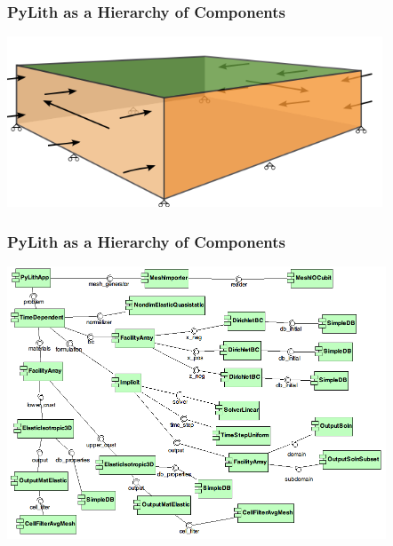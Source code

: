 \documentclass{beamer}
\begin{document}
\begin{frame}
  \frametitle{PyLith as a Hierarchy of Components}

  \vfill
  \begin{center}
    \includegraphics[height=2.0in]{figs/step01_diagram}
  \end{center}  
  \vfill

\end{frame}


\begin{frame}
  \frametitle{PyLith as a Hierarchy of Components}
  \includegraphics[height=3.2in]{figs/step01_components}
\end{frame}
\end{document}
